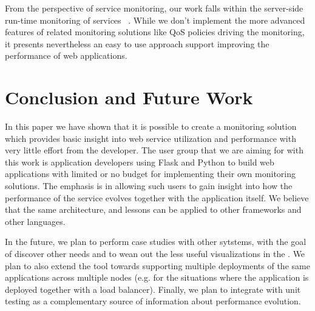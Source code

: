 \documentclass[conference]{IEEEtran}
\begin{document}
From the perspective of service monitoring, our work falls within the server-side run-time monitoring of services ~\cite{ghezzi2007run}. While we don't implement the more advanced features of related monitoring solutions like QoS policies driving the monitoring, it presents nevertheless an easy to use approach support improving the performance of web applications. 




\section{Conclusion and Future Work}
\label{sec:conclusions}


In this paper we have shown that it is possible to create a monitoring solution which provides basic insight into web service utilization and performance  with very little effort from the developer. The user group that we are aiming for with this work is application developers using Flask and Python to build web applications with limited or no budget for implementing their own monitoring solutions. The emphasis is in allowing such users to gain insight into how the performance of the service evolves together with the application itself. We believe that the same architecture, and lessons can be applied to other frameworks and other languages.

In the future, we plan to perform case studies with other sytstems, with the goal of discover other needs and to wean out the less useful visualizations in the \tool. We plan to also extend the tool towards supporting multiple deployments of the same applications across multiple nodes (e.g. for the situations where the application is deployed together with a load balancer). Finally, we plan to integrate \tool with unit testing as a complementary source of information about performance evolution.





\end{document}
